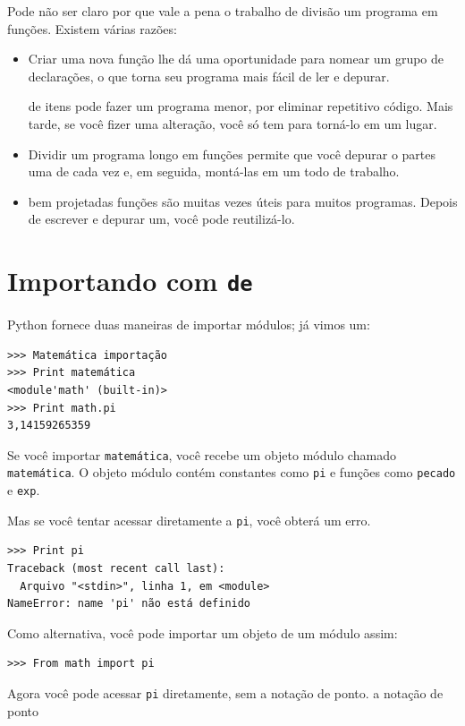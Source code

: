 \documentclass[10pt]{book}
\begin{document}
\begin{exercise}
Pode não ser claro por que vale a pena o trabalho de divisão
um programa em funções. Existem várias razões:

\begin{itemize}

\item Criar uma nova função lhe dá uma oportunidade para nomear um grupo
de declarações, o que torna seu programa mais fácil de ler e depurar.

 de itens pode fazer um programa menor, por eliminar repetitivo
código. Mais tarde, se você fizer uma alteração, você só tem
para torná-lo em um lugar.

\item Dividir um programa longo em funções permite que você depurar o
partes uma de cada vez e, em seguida, montá-las em um todo de trabalho.

\item bem projetadas funções são muitas vezes úteis para muitos programas.
Depois de escrever e depurar um, você pode reutilizá-lo.

\end{itemize}


\section{Importando com {\tt de}}

Python fornece duas maneiras de importar módulos; já vimos um:

\begin{verbatim}
>>> Matemática importação
>>> Print matemática
<module'math' (built-in)>
>>> Print math.pi
3,14159265359
\end{verbatim}
%
Se você importar {\tt matemática}, você recebe um objeto módulo chamado {\tt matemática}.
O objeto módulo contém constantes como {\tt pi} e funções
como {\tt pecado} e {\tt exp}.

Mas se você tentar acessar diretamente a {\tt pi}, você obterá um erro.

\begin{verbatim}
>>> Print pi
Traceback (most recent call last):
  Arquivo "<stdin>", linha 1, em <module>
NameError: name 'pi' não está definido
\end{verbatim}
%
Como alternativa, você pode importar um objeto de um módulo assim:

\begin{verbatim}
>>> From math import pi
\end{verbatim}
%
Agora você pode acessar {\tt pi} diretamente, sem a notação de ponto.
\index{} a notação de ponto


\end{exercise}
\end{document}

